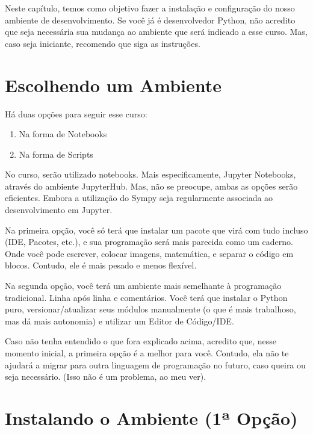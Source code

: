 \documentclass[letterpaper,10pt,english]{jupyterBook}
\begin{document}
\sphinxAtStartPar
Neste capítulo, temos como objetivo fazer a instalação e configuração do nosso ambiente de desenvolvimento. Se você já é desenvolvedor Python, não acredito que seja necessária sua mudança ao ambiente que será indicado a esse curso. Mas, caso seja iniciante, recomendo que siga as instruções.


\section{Escolhendo um Ambiente}
\label{\detokenize{chapters/1:escolhendo-um-ambiente}}
\sphinxAtStartPar
Há duas opções para seguir esse curso:
\begin{enumerate}
%
\item {} 
\sphinxAtStartPar
Na forma de Notebooks

\item {} 
\sphinxAtStartPar
Na forma de Scripts

\end{enumerate}

\sphinxAtStartPar
No curso, serão utilizado notebooks. Mais especificamente, Jupyter Notebooks, através do ambiente JupyterHub. Mas, não se preocupe, ambas as opções serão eficientes. Embora a utilização do Sympy seja regularmente associada ao desenvolvimento em Jupyter.

\sphinxAtStartPar
Na primeira opção, você só terá que instalar um pacote que virá com tudo incluso (IDE, Pacotes, etc.), e sua programação será mais parecida como um caderno. Onde você pode escrever, colocar imagens, matemática, e separar o código em blocos. Contudo, ele é mais pesado e menos flexível.

\sphinxAtStartPar
Na segunda opção, você terá um ambiente mais semelhante à programação tradicional. Linha após linha e comentários. Você terá que instalar o Python puro, versionar/atualizar seus módulos manualmente (o que é mais trabalhoso, mas dá mais autonomia) e utilizar um Editor de Código/IDE.

\sphinxAtStartPar
Caso não tenha entendido o que fora explicado acima, acredito que, nesse momento inicial, a primeira opção é a melhor para você. Contudo, ela não te ajudará a migrar para outra linguagem de programação no futuro, caso queira ou seja necessário. (Isso não é um problema, ao meu ver).


\section{Instalando o Ambiente (1ª Opção)}
\label{\detokenize{chapters/1:instalando-o-ambiente-1a-opcao}}
\end{document}
